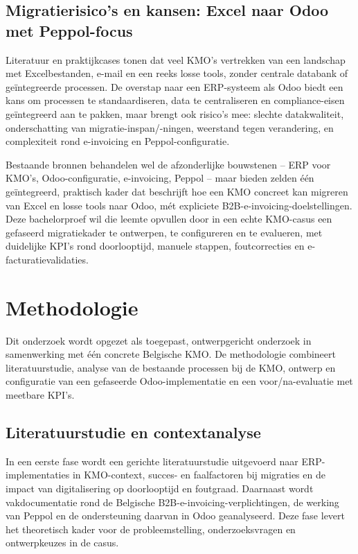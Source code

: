 \subsection{Migratierisico’s en kansen: Excel naar Odoo met Peppol-focus}

Literatuur en praktijkcases tonen dat veel KMO’s vertrekken van een landschap met Excelbestanden, e-mail en een reeks losse tools, zonder centrale databank of geïntegreerde processen.\autocite{Mestica_2024,SAP_2023,Gartner_2023} De overstap naar een ERP-systeem als Odoo biedt een kans om processen te standaardiseren, data te centraliseren en compliance-eisen geïntegreerd aan te pakken, maar brengt ook risico’s mee: slechte datakwaliteit, onderschatting van migratie-inspan/-ningen, weerstand tegen verandering, en complexiteit rond e-invoicing en Peppol-configuratie.

Bestaande bronnen behandelen wel de afzonderlijke bouwstenen – ERP voor KMO’s, Odoo-configuratie, e-invoicing, Peppol – maar bieden zelden één geïntegreerd, praktisch kader dat beschrijft hoe een KMO concreet kan migreren van Excel en losse tools naar Odoo, mét expliciete B2B-e-invoicing-doelstellingen.\autocite{EezeeIT_nodate,Mestica_2024} Deze bachelorproef wil die leemte opvullen door in een echte KMO-casus een gefaseerd migratiekader te ontwerpen, te configureren en te evalueren, met duidelijke KPI’s rond doorlooptijd, manuele stappen, foutcorrecties en e-facturatievalidaties.


\section{Methodologie}%
\label{sec:methodologie}

Dit onderzoek wordt opgezet als toegepast, ontwerpgericht onderzoek in samenwerking met één concrete Belgische KMO. De methodologie combineert literatuurstudie, analyse van de bestaande processen bij de KMO, ontwerp en configuratie van een gefaseerde Odoo-implementatie en een voor/na-evaluatie met meetbare KPI’s.

\subsection{Literatuurstudie en contextanalyse}

In een eerste fase wordt een gerichte literatuurstudie uitgevoerd naar ERP-implementaties in KMO-context, succes- en faalfactoren bij migraties en de impact van digitalisering op doorlooptijd en foutgraad. Daarnaast wordt vakdocumentatie rond de Belgische B2B-e-invoicing-verplichtingen, de werking van Peppol en de ondersteuning daarvan in Odoo geanalyseerd. Deze fase levert het theoretisch kader voor de probleemstelling, onderzoeksvragen en ontwerpkeuzes in de casus.

